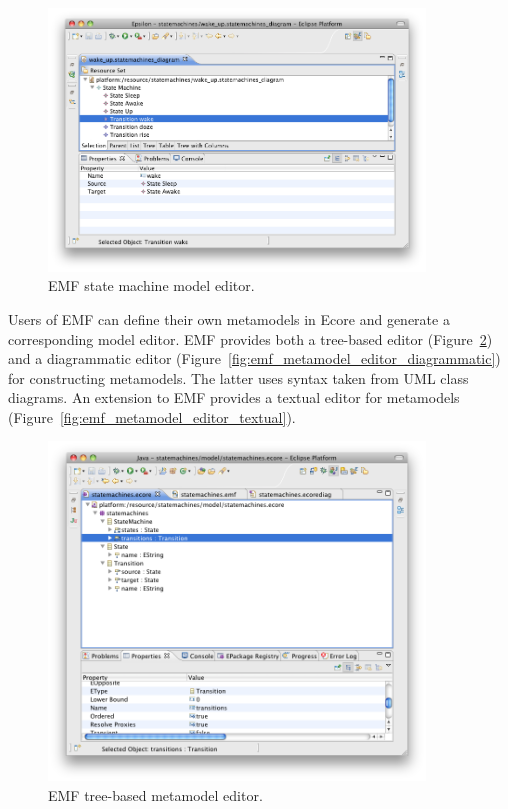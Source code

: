 \begin{figure}[htbp]
  \begin{center}
    \leavevmode
    \includegraphics[width=10cm]{2.Background/images/emf_model_editor.png}
  \end{center}
  \caption{EMF state machine model editor.}
  \label{fig:emf_model_editor}
\end{figure}

Users of EMF can define their own metamodels in Ecore and generate a corresponding model editor. EMF provides both a tree-based editor (Figure~\ref{fig:emf_metamodel_editor_tree}) and a diagrammatic editor (Figure~\ref{fig:emf_metamodel_editor_diagrammatic}) for constructing metamodels. The latter uses syntax taken from UML class diagrams. An extension to EMF provides a textual editor for metamodels (Figure~\ref{fig:emf_metamodel_editor_textual}).


\begin{figure}[htbp]
  \begin{center}
    \leavevmode
    \includegraphics[width=10cm]{2.Background/images/emf_metamodel_tree.png}
  \end{center}
  \caption{EMF tree-based metamodel editor.}
  \label{fig:emf_metamodel_editor_tree}
\end{figure}

